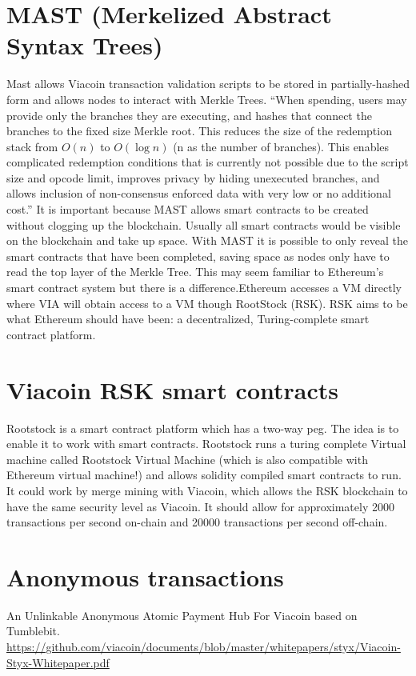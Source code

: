 \documentclass{article}
\begin{document}
\section{MAST (Merkelized Abstract Syntax Trees)} \label{MAST (Merkelized Abstract Syntax Trees)}
\cite{MAST}Mast allows Viacoin transaction validation scripts to be stored in partially-hashed
form and allows nodes to interact with Merkle Trees.
“When spending, users may provide only the branches they are executing, and
hashes that connect the branches to the fixed size Merkle root. This reduces the
size of the redemption stack from $O(n)$ to $O(\log{}n)$ (n as the number of branches).
This enables complicated redemption conditions that is currently not possible
due to the script size and opcode limit, improves privacy by hiding unexecuted
branches, and allows inclusion of non-consensus enforced data with very low or
no additional cost.” \newline \newline \noindent
It is important because MAST allows smart contracts to be created without
clogging up the blockchain. Usually all smart contracts would be visible on the
blockchain and take up space. With MAST it is possible to only reveal the smart contracts that have
been completed, saving space as nodes only have to read the top layer of the
Merkle Tree.
\noindent
This may seem familiar to Ethereum's smart contract system but there is a difference.Ethereum accesses a VM directly
where VIA will obtain access to a VM though RootStock (RSK). 
RSK aims to be what Ethereum should have been: a decentralized, Turing-complete smart
contract platform.

\section{Viacoin RSK smart contracts} \label{Viacoin RSK smart contracts}
\cite{rootstock}Rootstock is a smart contract platform which has a two-way peg. The idea is to
enable it to work with smart contracts. Rootstock runs a turing complete Virtual
machine called Rootstock Virtual Machine (which is also compatible with Ethereum
virtual machine!) and allows solidity compiled smart contracts to run.
It could work by merge mining with Viacoin, which allows the RSK blockchain to
have the same security level as Viacoin. It should allow for approximately 2000
transactions per second on-chain and 20000 transactions per second off-chain.

\section{Anonymous transactions} \label{Anonymous transactions}
\cite{styx}An Unlinkable Anonymous Atomic Payment Hub For Viacoin based on Tumblebit.\newline
\url{https://github.com/viacoin/documents/blob/master/whitepapers/styx/Viacoin-Styx-Whitepaper.pdf}
\newpage
\printbibliography
\end{document}
